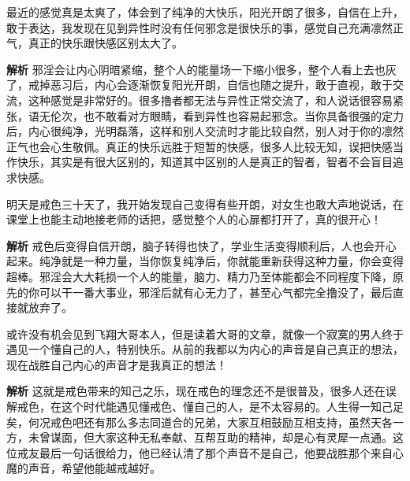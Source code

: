 \begin{case}
    最近的感觉真是太爽了，体会到了纯净的大快乐，阳光开朗了很多，自信在上升，敢于表达，我发现在见到异性时没有任何邪念是很快乐的事，感觉自己充满凛然正气，真正的快乐跟快感区别太大了。

    \textbf{解析} 邪淫会让内心阴暗紧缩，整个人的能量场一下缩小很多，整个人看上去也灰了，戒掉恶习后，内心会逐渐恢复阳光开朗，自信也随之提升，敢于直视，敢于交流，这种感觉是非常好的。很多撸者都无法与异性正常交流了，和人说话很容易紧张，语无伦次，也不敢看对方眼睛，看到异性也容易起邪念。当你具备很强的定力后，内心很纯净，光明磊落，这样和别人交流时才能比较自然，别人对于你的凛然正气也会心生敬佩。真正的快乐远胜于短暂的快感，很多人比较无知，误把快感当作快乐，其实是有很大区别的，知道其中区别的人是真正的智者，智者不会盲目追求快感。
\end{case}

\begin{case}
    明天是戒色三十天了，我开始发现自己变得有些开朗，对女生也敢大声地说话，在课堂上也能主动地接老师的话把，感觉整个人的心扉都打开了，真的很开心！

    \textbf{解析} 戒色后变得自信开朗，脑子转得也快了，学业生活变得顺利后，人也会开心起来。纯净就是一种力量，当你恢复纯净后，你就能重新获得这种力量，你会变得超棒。邪淫会大大耗损一个人的能量，脑力、精力乃至体能都会不同程度下降，原先的你可以干一番大事业，邪淫后就有心无力了，甚至心气都完全撸没了，最后直接就放弃了。
\end{case}

\begin{case}[知己之乐]
    或许没有机会见到飞翔大哥本人，但是读着大哥的文章，就像一个寂寞的男人终于遇见一个懂自己的人，特别快乐。从前的我都以为内心的声音是自己真正的想法，现在战胜自己内心的声音才是我真正的想法！

    \textbf{解析} 这就是戒色带来的知己之乐，现在戒色的理念还不是很普及，很多人还在误解戒色，在这个时代能遇见懂戒色、懂自己的人，是不太容易的。人生得一知己足矣，何况戒色吧还有那么多志同道合的兄弟，大家互相鼓励互相支持，虽然天各一方，未曾谋面，但大家这种无私奉献、互帮互助的精神，却是心有灵犀一点通。这位戒友最后一句话很给力，他已经认清了那个声音不是自己，他要战胜那个来自心魔的声音，希望他能越戒越好。
\end{case}

